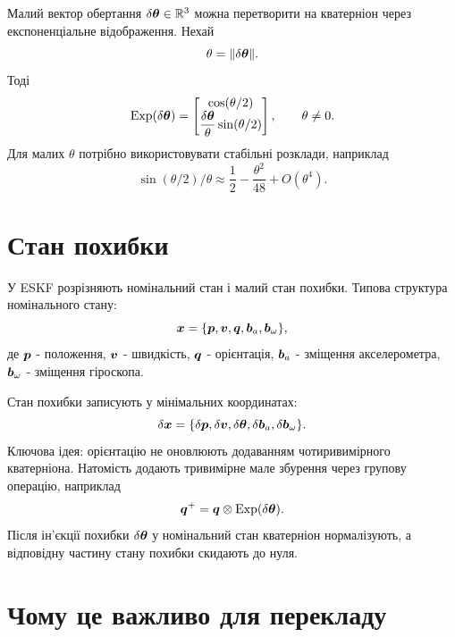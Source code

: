 Малий вектор обертання $\delta\bm{\theta}\in\mathbb{R}^3$ можна перетворити на кватерніон через експоненціальне відображення. Нехай
\begin{equation}
    \theta=\|\delta\bm{\theta}\|.
\end{equation}
Тоді
\begin{equation}
    \operatorname{Exp}(\delta\bm{\theta})=
    \begin{bmatrix}
        \cos(\theta/2)\\
        \dfrac{\delta\bm{\theta}}{\theta}\sin(\theta/2)
    \end{bmatrix},
    \qquad \theta\ne 0.
\end{equation}
Для малих $\theta$ потрібно використовувати стабільні розклади, наприклад
\begin{equation}
    \sin(\theta/2)/\theta \approx \frac{1}{2}-\frac{\theta^2}{48}+O(\theta^4).
\end{equation}

\section{Стан похибки}

У ESKF розрізняють номінальний стан і малий стан похибки. Типова структура номінального стану:
\begin{equation}
    \bm{x}=\{\bm{p},\bm{v},\bm{q},\bm{b}_a,\bm{b}_\omega\},
\end{equation}
де $\bm{p}$ - положення, $\bm{v}$ - швидкість, $\bm{q}$ - орієнтація, $\bm{b}_a$ - зміщення акселерометра, $\bm{b}_\omega$ - зміщення гіроскопа.

Стан похибки записують у мінімальних координатах:
\begin{equation}
    \delta\bm{x}=\{\delta\bm{p},\delta\bm{v},\delta\bm{\theta},\delta\bm{b}_a,\delta\bm{b}_\omega\}.
\end{equation}
Ключова ідея: орієнтацію не оновлюють додаванням чотиривимірного кватерніона. Натомість додають тривимірне мале збурення через групову операцію, наприклад
\begin{equation}
    \bm{q}^{+}=\bm{q}\otimes \operatorname{Exp}(\delta\bm{\theta}).
\end{equation}
Після ін'єкції похибки $\delta\bm{\theta}$ у номінальний стан кватерніон нормалізують, а відповідну частину стану похибки скидають до нуля.

\section{Чому це важливо для перекладу}

